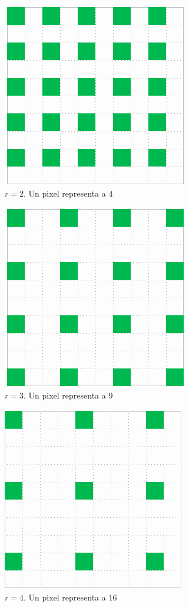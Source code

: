 \documentclass[a4paper]{article}
\begin{document}
\begin{multicols}{2}
\begin{figure}[H]
  \centering
  \includegraphics[scale=0.65]{graficos/Submuestreo-2.png}
  \caption{ $r=2$. Un pixel representa a 4}
\end{figure}

\begin{figure}[H]
  \centering
  \includegraphics[scale=0.65]{graficos/Submuestreo-3.png}
  \caption{ $r=3$. Un pixel representa a 9}
\end{figure}

\begin{figure}[H]
  \centering
  \includegraphics[scale=0.65]{graficos/Submuestreo-4.png}
  \caption{ $r=4$. Un pixel representa a 16}
\end{figure}
\end{multicols}
\end{document}
